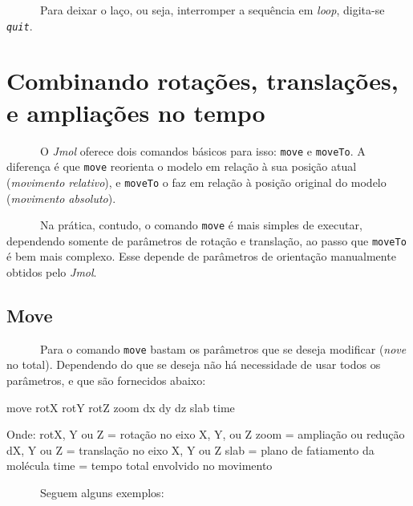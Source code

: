 \documentclass[
  letterpaper,
  DIV=11,
  numbers=noendperiod]{scrreprt}
\newenvironment{Shaded}{\begin{snugshade}}{\end{snugshade}}
\newcommand{\NormalTok}[1]{\textcolor[rgb]{0.00,0.23,0.31}{#1}}
\newcommand{\OtherTok}[1]{\textcolor[rgb]{0.00,0.23,0.31}{#1}}
\newcommand{\SpecialCharTok}[1]{\textcolor[rgb]{0.37,0.37,0.37}{#1}}
\begin{document}
~~~~~~Para deixar o laço, ou seja, interromper a sequência em
\emph{loop}, digita-se \emph{\texttt{quit}}.

\section{Combinando rotações, translações, e ampliações no
tempo}\label{combinando-rotauxe7uxf5es-translauxe7uxf5es-e-ampliauxe7uxf5es-no-tempo}

~~~~~~O \emph{Jmol} oferece dois comandos básicos para isso:
\texttt{move} e \texttt{moveTo}. A diferença é que \texttt{move}
reorienta o modelo em relação à sua posição atual (\emph{movimento
relativo}), e \texttt{moveTo} o faz em relação à posição original do
modelo (\emph{movimento absoluto}).

~~~~~~Na prática, contudo, o comando \texttt{move} é mais simples de
executar, dependendo somente de parâmetros de rotação e translação, ao
passo que \texttt{moveTo} é bem mais complexo. Esse depende de
parâmetros de orientação manualmente obtidos pelo \emph{Jmol}.

\subsection{Move}\label{move}

~~~~~~Para o comando \texttt{move} bastam os parâmetros que se deseja
modificar (\emph{nove} no total). Dependendo do que se deseja não há
necessidade de usar todos os parâmetros, e que são fornecidos abaixo:

\begin{Shaded}
\begin{Highlighting}[]
\NormalTok{move rotX rotY rotZ zoom dx dy dz slab time}

\NormalTok{Onde}\SpecialCharTok{:}
\NormalTok{  rotX, Y ou Z }\OtherTok{=}\NormalTok{ rotação no eixo X, Y, ou Z}
\NormalTok{  zoom }\OtherTok{=}\NormalTok{ ampliação ou redução}
\NormalTok{  dX, Y ou Z }\OtherTok{=}\NormalTok{ translação no eixo X, Y ou Z}
\NormalTok{  slab }\OtherTok{=}\NormalTok{ plano de fatiamento da molécula}
\NormalTok{  time }\OtherTok{=}\NormalTok{ tempo total envolvido no movimento}
\end{Highlighting}
\end{Shaded}

~~~~~~Seguem alguns exemplos:
\end{document}
